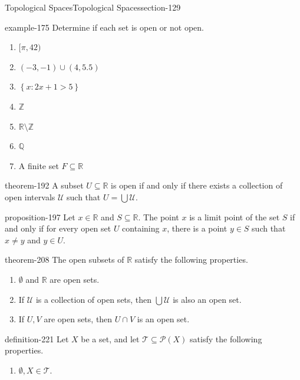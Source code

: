 \documentclass[oneside,10pt,]{article}
\newcommand{\mb}{\mathbb}
\newcommand{\mc}{\mathcal}
\newcommand{\setBuilder}[2]{\left\{#1:#2\right\}}
\begin{document}
\begin{sectionptx}{Topological Spaces}{}{Topological Spaces}{}{}{section-129}
\begin{example}{}{example-175}
Determine if each set is open or not open.%
\leavevmode%
\begin{enumerate}
\item\hypertarget{li-178}{}\([\pi,42)\)%
\item\hypertarget{li-180}{}\((-3,-1)\cup(4,5.5)\)%
\item\hypertarget{li-182}{}\(\setBuilder{x}{2x+1>5}\)%
\item\hypertarget{li-184}{}\(\mb Z\)%
\item\hypertarget{li-186}{}\(\mb R\setminus\mb Z\)%
\item\hypertarget{li-188}{}\(\mb Q\)%
\item\hypertarget{li-190}{}A finite set \(F\subseteq\mb R\)%
\end{enumerate}
\end{example}
\begin{theorem}{}{}{theorem-192}%
\hypertarget{p-193}{}%
A subset \(U\subseteq\mb R\) is open if and only if there exists a collection of open intervals \(\mc U\) such that \(U=\bigcup\mc U\).%
\end{theorem}
\begin{proposition}{}{}{proposition-197}%
\hypertarget{p-198}{}%
Let \(x\in\mb R\) and \(S\subseteq\mb R\). The point \(x\) is a limit point of the set \(S\) if and only if for every open set \(U\) containing \(x\), there is a point \(y\in S\) such that \(x\not=y\) and \(y\in U\).%
\end{proposition}
\begin{theorem}{}{}{theorem-208}%
\hypertarget{p-209}{}%
The open subsets of \(\mb R\) satisfy the following properties.%
\leavevmode%
\begin{enumerate}
\item\hypertarget{li-212}{}\(\emptyset\) and \(\mb R\) are open sets.%
\item\hypertarget{li-215}{}If \(\mc U\) is a collection of open sets, then \(\bigcup\mc U\) is also an open set.%
\item\hypertarget{li-218}{}If \(U,V\) are open sets, then \(U\cap V\) is an open set.%
\end{enumerate}
\end{theorem}
\begin{definition}{}{definition-221}%
\hypertarget{p-222}{}%
Let \(X\) be a set, and let \(\mc T\subseteq \mc P(X)\) satisfy the following properties.%
\leavevmode%
\begin{enumerate}
\item\hypertarget{li-226}{}\(\emptyset,X\in\mc T\).%

\end{enumerate}
\end{definition}
\end{sectionptx}
\end{document}
